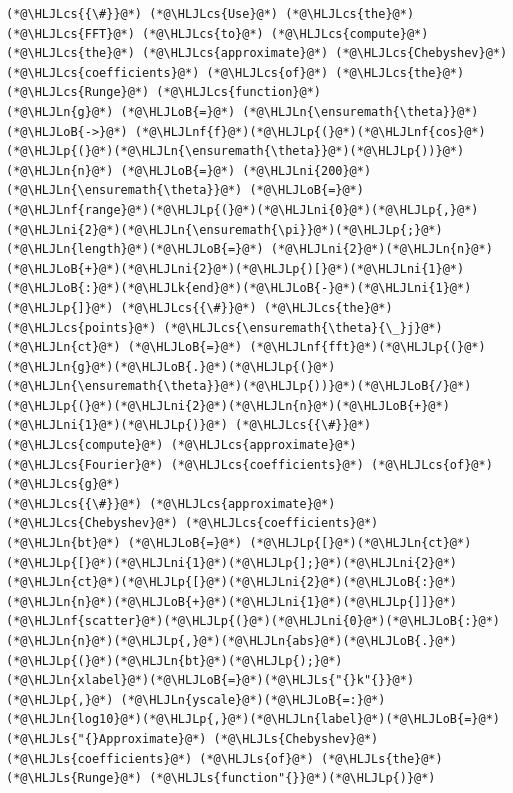 \documentclass[12pt,a4paper]{article}
\newcommand{\HLJLk}[1]{\textcolor[RGB]{148,91,176}{\textbf{#1}}}
\newcommand{\HLJLn}[1]{#1}
\newcommand{\HLJLnf}[1]{\textcolor[RGB]{66,102,213}{#1}}
\newcommand{\HLJLs}[1]{\textcolor[RGB]{201,61,57}{#1}}
\newcommand{\HLJLni}[1]{\textcolor[RGB]{59,151,46}{#1}}
\newcommand{\HLJLoB}[1]{\textcolor[RGB]{102,102,102}{\textbf{#1}}}
\newcommand{\HLJLp}[1]{#1}
\newcommand{\HLJLcs}[1]{\textcolor[RGB]{153,153,119}{\textit{#1}}}
\begin{document}
\begin{lstlisting}
(*@\HLJLcs{{\#}}@*) (*@\HLJLcs{Use}@*) (*@\HLJLcs{the}@*) (*@\HLJLcs{FFT}@*) (*@\HLJLcs{to}@*) (*@\HLJLcs{compute}@*) (*@\HLJLcs{the}@*) (*@\HLJLcs{approximate}@*) (*@\HLJLcs{Chebyshev}@*) (*@\HLJLcs{coefficients}@*) (*@\HLJLcs{of}@*) (*@\HLJLcs{the}@*) (*@\HLJLcs{Runge}@*) (*@\HLJLcs{function}@*)
(*@\HLJLn{g}@*) (*@\HLJLoB{=}@*) (*@\HLJLn{\ensuremath{\theta}}@*) (*@\HLJLoB{->}@*) (*@\HLJLnf{f}@*)(*@\HLJLp{(}@*)(*@\HLJLnf{cos}@*)(*@\HLJLp{(}@*)(*@\HLJLn{\ensuremath{\theta}}@*)(*@\HLJLp{))}@*)
(*@\HLJLn{n}@*) (*@\HLJLoB{=}@*) (*@\HLJLni{200}@*)
(*@\HLJLn{\ensuremath{\theta}}@*) (*@\HLJLoB{=}@*) (*@\HLJLnf{range}@*)(*@\HLJLp{(}@*)(*@\HLJLni{0}@*)(*@\HLJLp{,}@*)(*@\HLJLni{2}@*)(*@\HLJLn{\ensuremath{\pi}}@*)(*@\HLJLp{;}@*)(*@\HLJLn{length}@*)(*@\HLJLoB{=}@*) (*@\HLJLni{2}@*)(*@\HLJLn{n}@*)(*@\HLJLoB{+}@*)(*@\HLJLni{2}@*)(*@\HLJLp{)[}@*)(*@\HLJLni{1}@*)(*@\HLJLoB{:}@*)(*@\HLJLk{end}@*)(*@\HLJLoB{-}@*)(*@\HLJLni{1}@*)(*@\HLJLp{]}@*) (*@\HLJLcs{{\#}}@*) (*@\HLJLcs{the}@*) (*@\HLJLcs{points}@*) (*@\HLJLcs{\ensuremath{\theta}{\_}j}@*)
(*@\HLJLn{ct}@*) (*@\HLJLoB{=}@*) (*@\HLJLnf{fft}@*)(*@\HLJLp{(}@*)(*@\HLJLn{g}@*)(*@\HLJLoB{.}@*)(*@\HLJLp{(}@*)(*@\HLJLn{\ensuremath{\theta}}@*)(*@\HLJLp{))}@*)(*@\HLJLoB{/}@*)(*@\HLJLp{(}@*)(*@\HLJLni{2}@*)(*@\HLJLn{n}@*)(*@\HLJLoB{+}@*)(*@\HLJLni{1}@*)(*@\HLJLp{)}@*) (*@\HLJLcs{{\#}}@*) (*@\HLJLcs{compute}@*) (*@\HLJLcs{approximate}@*) (*@\HLJLcs{Fourier}@*) (*@\HLJLcs{coefficients}@*) (*@\HLJLcs{of}@*) (*@\HLJLcs{g}@*)
(*@\HLJLcs{{\#}}@*) (*@\HLJLcs{approximate}@*) (*@\HLJLcs{Chebyshev}@*) (*@\HLJLcs{coefficients}@*)
(*@\HLJLn{bt}@*) (*@\HLJLoB{=}@*) (*@\HLJLp{[}@*)(*@\HLJLn{ct}@*)(*@\HLJLp{[}@*)(*@\HLJLni{1}@*)(*@\HLJLp{];}@*)(*@\HLJLni{2}@*)(*@\HLJLn{ct}@*)(*@\HLJLp{[}@*)(*@\HLJLni{2}@*)(*@\HLJLoB{:}@*)(*@\HLJLn{n}@*)(*@\HLJLoB{+}@*)(*@\HLJLni{1}@*)(*@\HLJLp{]]}@*) 
(*@\HLJLnf{scatter}@*)(*@\HLJLp{(}@*)(*@\HLJLni{0}@*)(*@\HLJLoB{:}@*)(*@\HLJLn{n}@*)(*@\HLJLp{,}@*)(*@\HLJLn{abs}@*)(*@\HLJLoB{.}@*)(*@\HLJLp{(}@*)(*@\HLJLn{bt}@*)(*@\HLJLp{);}@*)
(*@\HLJLn{xlabel}@*)(*@\HLJLoB{=}@*)(*@\HLJLs{"{}k"{}}@*)(*@\HLJLp{,}@*) (*@\HLJLn{yscale}@*)(*@\HLJLoB{=:}@*)(*@\HLJLn{log10}@*)(*@\HLJLp{,}@*)(*@\HLJLn{label}@*)(*@\HLJLoB{=}@*)(*@\HLJLs{"{}Approximate}@*) (*@\HLJLs{Chebyshev}@*) (*@\HLJLs{coefficients}@*) (*@\HLJLs{of}@*) (*@\HLJLs{the}@*) (*@\HLJLs{Runge}@*) (*@\HLJLs{function"{}}@*)(*@\HLJLp{)}@*)
\end{lstlisting}
\end{document}
